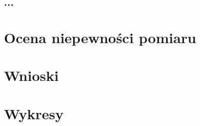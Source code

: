 \documentclass[a4paper,12pt]{article}
\begin{document}
\subsection{...}

\section{Ocena niepewności pomiaru}

\section{Wnioski}

\section{Wykresy}



\end{document}
